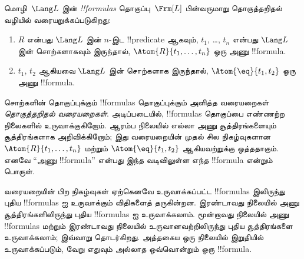 \documentclass[../../../include/open-logic-section]{subfiles}
\begin{document}
\begin{defn}[வாய்பாடுகள்]
மொழி~$\Lang L$ இன் \emph{!!{formula}s} தொகுப்பு~$\Frm[L]$ பின்வருமாறு
தொகுத்தறிதல் வழியில் வரையறுக்கப்படுகிறது:
\begin{enumerate}


\item $R$ என்பது $\Lang L$ இன் $n$-இட !!{predicate} ஆகவும், $t_1$, \dots,
  $t_n$ என்பது $\Lang L$ இன் சொற்களாகவும் இருந்தால்,
  $\Atom{R}{t_1,\ldots, t_n}$ ஒரு அணு !!{formula}.

\item $t_1$, $t_2$ ஆகியவை $\Lang L$ இன் சொற்களாக இருந்தால்,
  $\Atom{\eq}{t_1, t_2}$ ஒரு அணு !!{formula}.








\end{enumerate}
\end{defn}

\begin{explain}
சொற்களின் தொகுப்புக்கும் !!{formula}s தொகுப்புக்கும் அளித்த வரையறைகள்
\emph{தொகுத்தறிதல் வரையறைகள்}. அடிப்படையில், !!{formula}s தொகுப்பை எண்ணற்ற
நிலைகளில் உருவாக்குகிறோம். ஆரம்ப நிலையில் எல்லா அணு சூத்திரங்களையும்
சூத்திரங்களாக அறிவிக்கிறோம்; இது வரையறையின் முதல் சில நிகழ்வுகளான
%
%
$\Atom{R}{t_1,\dots,t_n}$ மற்றும் $\Atom{\eq}{t_1,t_2}$ ஆகியவற்றுக்கு
ஒத்ததாகும். எனவே ``அணு !!{formula}'' என்பது இந்த வடிவிலுள்ள எந்த !!{formula}
என்றும் பொருள்.

வரையறையின் பிற நிகழ்வுகள் ஏற்கெனவே உருவாக்கப்பட்ட !!{formula}s இலிருந்து
புதிய !!{formula}s ஐ உருவாக்கும் விதிகளைத் தருகின்றன. இரண்டாவது நிலையில்
அணு சூத்திரங்களிலிருந்து புதிய !!{formula}s ஐ உருவாக்கலாம். மூன்றாவது
நிலையில் அணு !!{formula}s மற்றும் இரண்டாவது நிலையில் உருவானவற்றிலிருந்து
புதிய சூத்திரங்களை உருவாக்கலாம்; இவ்வாறு தொடர்கிறது. அத்தகைய ஒரு நிலையில்
இறுதியில் உருவாக்கப்படும், வேறு எதுவும் அல்லாத ஒவ்வொன்றும் ஒரு !!{formula}.
\end{explain}
\end{document}
